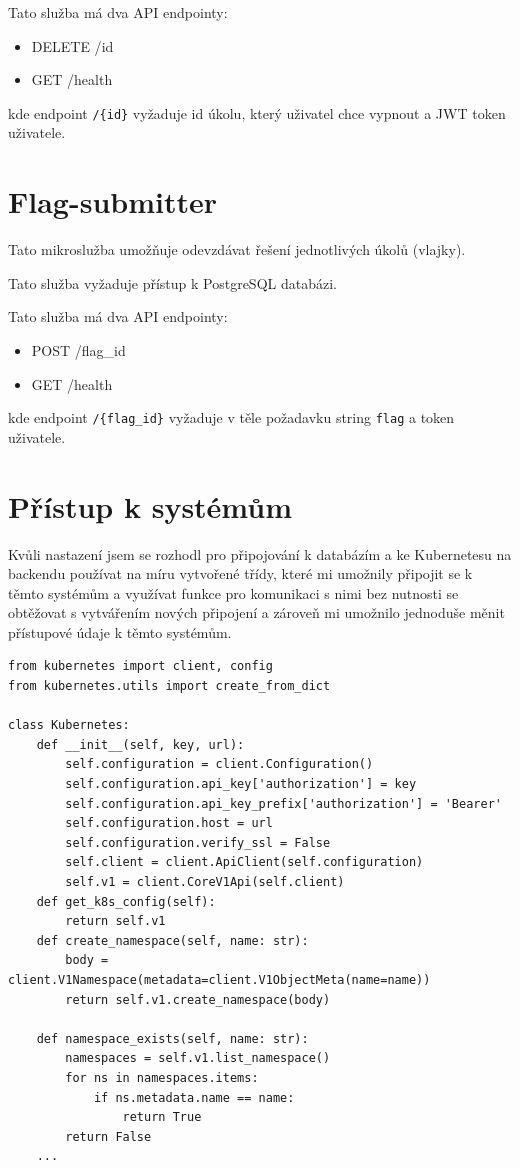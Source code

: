 \documentclass[12pt, a4paper,
oneside,      %
openright
]{report}
\begin{document}
Tato služba má dva API endpointy:
\begin{itemize}
	\item DELETE /{id}
	\item GET /health
\end{itemize}
kde endpoint \texttt{/\{id\}} vyžaduje id úkolu, který uživatel chce vypnout a JWT token uživatele.

\section{Flag-submitter}
Tato mikroslužba umožňuje odevzdávat řešení jednotlivých úkolů (vlajky).

Tato služba vyžaduje přístup k PostgreSQL databázi.

Tato služba má dva API endpointy:
\begin{itemize}
	\item POST /{flag\_id}
	\item GET /health
\end{itemize}
kde endpoint \texttt{/\{flag\_id\}} vyžaduje v těle požadavku string \texttt{flag} a token uživatele.

\section{Přístup k systémům}
Kvůli nastazení jsem se rozhodl pro připojování k databázím a ke Kubernetesu na backendu používat na míru vytvořené třídy, které mi umožnily připojit se k těmto systémům a využívat funkce pro komunikaci s nimi bez nutnosti se obtěžovat s vytvářením nových připojení a zároveň mi umožnilo jednoduše měnit přístupové údaje k těmto systémům.

\begin{lstlisting}[style=Python, caption=Ukázka třídy pro připojení ke Kubernetes]
from kubernetes import client, config
from kubernetes.utils import create_from_dict

class Kubernetes:
    def __init__(self, key, url):
        self.configuration = client.Configuration()
        self.configuration.api_key['authorization'] = key
        self.configuration.api_key_prefix['authorization'] = 'Bearer'
        self.configuration.host = url
        self.configuration.verify_ssl = False
        self.client = client.ApiClient(self.configuration)
        self.v1 = client.CoreV1Api(self.client)
    def get_k8s_config(self):
        return self.v1
    def create_namespace(self, name: str):
        body = client.V1Namespace(metadata=client.V1ObjectMeta(name=name))
        return self.v1.create_namespace(body)

    def namespace_exists(self, name: str):
        namespaces = self.v1.list_namespace()
        for ns in namespaces.items:
            if ns.metadata.name == name:
                return True
        return False
	...
\end{lstlisting}
\end{document}
